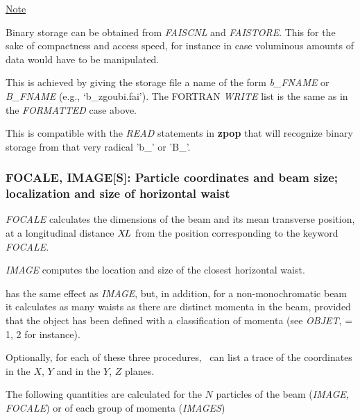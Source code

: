 \bigskip

\noindent\underline{Note}

\noindent Binary storage can be obtained from \textsl{FAISCNL} and \textsl{FAISTORE}. This for 
the sake of compactness and access speed, for instance  in case  voluminous amounts of 
data would have to be manipulated. 

This is achieved by giving the storage file a name of the form \textsl{b\_FNAME} 
or \textsl{B\_FNAME}  (e.g., `b\_zgoubi.fai'). The FORTRAN \textsl{WRITE} list 
is the same as in the \textsl{FORMATTED} case above.  

This is compatible with the \textsl{READ} statements in \textbf{zpop} that will recognize binary storage 
from that very radical 'b\_' or 'B\_'. 
\newpage

\subsubsection*{FOCALE, IMAGE[S]: Particle coordinates and beam size;  localization and
size  of  horizontal waist}\label{FOCALE}\label{IMAGE}\label{IMAGES}

\textsl{FOCALE}  calculates the dimensions of the beam and its mean 
transverse position, at a longitudinal distance $ X\!L $ from the position 
corresponding to the keyword \textsl{FOCALE}.  
\bigskip

\noindent\textsl{IMAGE}  computes the location and size
of the closest horizontal waist.  
\bigskip

\noindent\IMAGES{}  has the same effect as \textsl{IMAGE},
 but, in addition, for a 
non-monochromatic beam it calculates as many waists as there are distinct momenta in 
the beam, provided that the object has been defined with a classification of momenta 
(see \textsl{OBJET}, \KOBJ = 1, 2  for instance).  
\bigskip

\noindent Optionally, for each of these three procedures, \zgou\ can
list a trace of the coordinates in the $ X$, $Y $ and in the $ Y$, $Z $ planes.  
\bigskip

\noindent The following quantities are calculated for the $ N $ particles of
the beam (\textsl{IMAGE,   FOCALE}) or of each group    of momenta 
(\textsl{IMAGES})  
\bigskip

